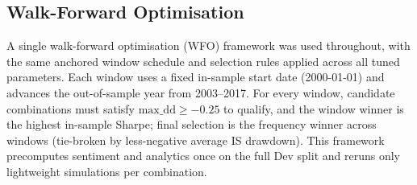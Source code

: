 \documentclass[11pt,twoside,a4paper]{article}
\begin{document}
\begin{table}[H]
\centering
\caption{Performance metrics across all strategy versions (Dev and Val splits). v5 refers to v5.4, the final implementation.}
\label{tab:version-progression}
\end{table}

\subsection{Walk-Forward Optimisation}

A single walk-forward optimisation (WFO) framework was used throughout, with the same anchored window schedule and selection rules applied across all tuned parameters. Each window uses a fixed in-sample start date (2000-01-01) and advances the out-of-sample year from 2003--2017. For every window, candidate combinations must satisfy $\text{max\_dd} \ge -0.25$ to qualify, and the window winner is the highest in-sample Sharpe; final selection is the frequency winner across windows (tie-broken by less-negative average IS drawdown). This framework precomputes sentiment and analytics once on the full Dev split and reruns only lightweight simulations per combination.
\end{document}
